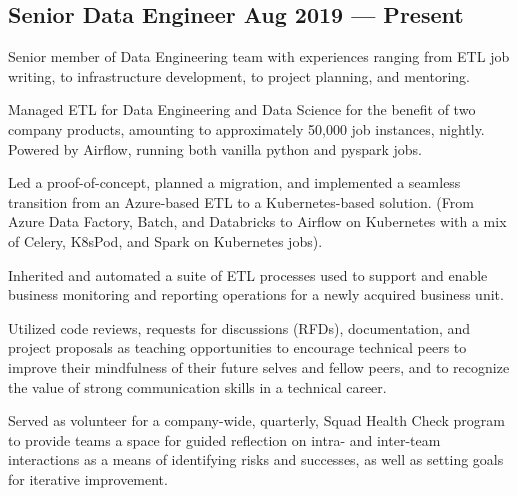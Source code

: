 \documentclass[letter,10pt]{article}
\begin{document}
\subsection{{Senior Data Engineer \hfill Aug 2019 --- Present}}

\vspace{10pt}

Senior member of Data Engineering team with experiences ranging from ETL job writing, to infrastructure development, to project planning, and mentoring.

\vspace{10pt}

\begin{zitemize}
    \item Managed ETL for Data Engineering and Data Science for the benefit of two company products, amounting to approximately 50,000 job instances, nightly. Powered by Airflow, running both vanilla python and pyspark jobs.
    \item Led a proof-of-concept, planned a migration, and implemented a seamless transition from an Azure-based ETL to a Kubernetes-based solution. (From Azure Data Factory, Batch, and Databricks to Airflow on Kubernetes with a mix of Celery, K8sPod, and Spark on Kubernetes jobs).
    \item Inherited and automated a suite of ETL processes used to support and enable business monitoring and reporting operations for a newly acquired business unit.
    \item Utilized code reviews, requests for discussions (RFDs), documentation, and project proposals as teaching opportunities to encourage technical peers to improve their mindfulness of their future selves and fellow peers, and to recognize the value of strong communication skills in a technical career.
    \item Served as volunteer for a company-wide, quarterly, Squad Health Check program to provide teams a space for guided reflection on intra- and inter-team interactions as a means of identifying risks and successes, as well as setting goals for iterative improvement.
\end{zitemize}

\vspace{5pt}
\vspace{5pt}

\end{document}

